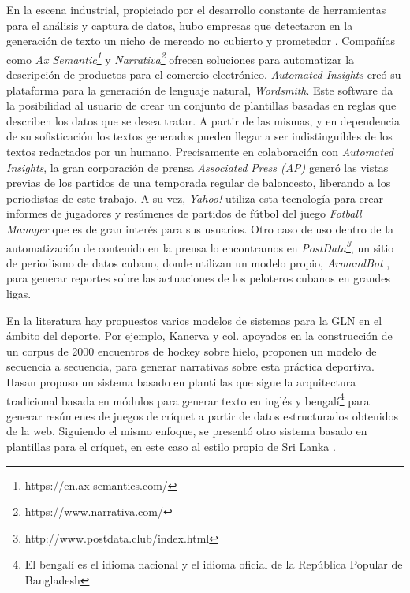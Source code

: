     En la escena industrial, propiciado por el desarrollo constante de herramientas para el análisis y captura de datos,
hubo empresas que detectaron en la generación de texto un nicho de mercado no cubierto y prometedor . Compañías como \textit{Ax Semantic\footnote[1]{https://en.ax-semantics.com/}} y 
\textit{Narrativa\footnote[2]{https://www.narrativa.com/}} ofrecen soluciones para automatizar la descripción de productos para el comercio electrónico. 
\textit{Automated Insights} creó su plataforma para la generación de lenguaje natural, \textit{Wordsmith}. Este software da la posibilidad al usuario de crear un conjunto 
de plantillas basadas en reglas que describen los datos que se desea tratar. A partir de las mismas, y en dependencia de su sofisticación los textos generados pueden llegar a ser 
indistinguibles de los textos redactados por un humano. Precisamente en colaboración con \textit{Automated Insights}, la gran corporación de prensa \textit{Associated Press (AP)} generó
las vistas previas de los partidos de una temporada regular de baloncesto, liberando a los periodistas de este trabajo. A su vez, \textit{Yahoo!} utiliza esta tecnología para crear informes 
de jugadores y resúmenes de partidos de fútbol del juego \textit{Fotball Manager} que es de gran interés para sus usuarios. Otro caso de uso dentro de la automatización de contenido en la prensa lo encontramos en
\textit{PostData\footnote[3]{http://www.postdata.club/index.html}}, un sitio de periodismo 
de datos cubano, donde utilizan un modelo propio, \textit{ArmandBot} , para generar reportes sobre las actuaciones de los peloteros cubanos en grandes ligas.

    En la literatura hay propuestos varios modelos de sistemas para la GLN en el ámbito del deporte. Por ejemplo, Kanerva y col.  apoyados en la construcción de un corpus de 2000 encuentros de hockey sobre hielo, 
proponen un modelo de secuencia a secuencia, para generar narrativas sobre esta práctica deportiva. Hasan  propuso un sistema basado en plantillas que sigue la arquitectura tradicional basada en módulos para 
generar texto en inglés y bengalí\footnote[5]{El bengalí es el idioma nacional y el idioma oficial de la República Popular de Bangladesh} para generar resúmenes de juegos de críquet a partir de datos estructurados obtenidos de la web. 
Siguiendo el mismo enfoque, se presentó otro sistema basado en plantillas para el críquet, en este caso al estilo propio de Sri Lanka .
 
